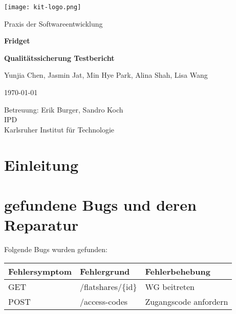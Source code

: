 \documentclass[a4paper]{scrreprt}
\begin{document}
	
	\begin{flushright}
		\texttt{[image: kit-logo.png]}\\[0.5cm]
	\end{flushright}
	\vspace*{2cm}
	
	\begin{center}
		\large Praxis der Softwareentwicklung
		\vspace*{1.5cm}
		
		\textbf{\huge Fridget}
		\vspace*{1cm}
		
		\textbf{\Large Qualitätssicherung Testbericht}
		\vspace*{2cm}
		
		Yunjia Chen, Jasmin Jat, Min Hye Park, Alina Shah, Lisa Wang
		\vspace*{1cm}
		
		\today
		\vspace*{2.5cm}
		
		Betreuung: Erik Burger, Sandro Koch\\[0.5cm]
		IPD\\[0.5cm]
		
		Karlsruher Institut für Technologie
		
	\end{center}

	\thispagestyle{empty}
	
	\tableofcontents
	
	\chapter{Einleitung}
	
	
	\chapter{gefundene Bugs und deren Reparatur}
	Folgende Bugs wurden gefunden:
	\begin{flushleft}
		\begin{longtable}{|p{}|p{}|p{}|}
		\hline
		\textbf{Fehlersymptom} & \textbf{Fehlergrund} & \textbf{Fehlerbehebung} \\
		\hline
		GET & /flatshares/\{id\} & WG beitreten \\
		\hline
		POST & /access-codes & Zugangscode anfordern \\ 
		\hline

		\end{longtable}
	\end{flushleft}	
\end{document}
